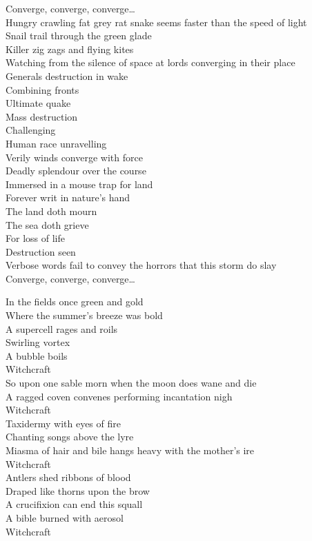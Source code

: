 Converge, converge, converge… \\

Hungry crawling fat grey rat snake seems faster than the speed of light \\
Snail trail through the green glade \\
Killer zig zags and flying kites \\
Watching from the silence of space at lords converging in their place \\
Generals destruction in wake \\
Combining fronts \\
Ultimate quake \\

Mass destruction \\
Challenging \\
Human race unravelling \\

Verily winds converge with force \\
Deadly splendour over the course \\
Immersed in a mouse trap for land \\
Forever writ in nature's hand \\
The land doth mourn \\
The sea doth grieve \\
For loss of life \\
Destruction seen \\
Verbose words fail to convey the horrors that this storm do slay \\

Converge, converge, converge… \\



In the fields once green and gold \\
Where the summer's breeze was bold \\
A supercell rages and roils \\
Swirling vortex \\
A bubble boils \\
Witchcraft \\
So upon one sable morn when the moon does wane and die \\
A ragged coven convenes performing incantation nigh \\
Witchcraft \\
Taxidermy with eyes of fire \\
Chanting songs above the lyre \\
Miasma of hair and bile hangs heavy with the mother's ire \\
Witchcraft \\
Antlers shed ribbons of blood \\
Draped like thorns upon the brow \\
A crucifixion can end this squall \\
A bible burned with aerosol \\
Witchcraft \\

